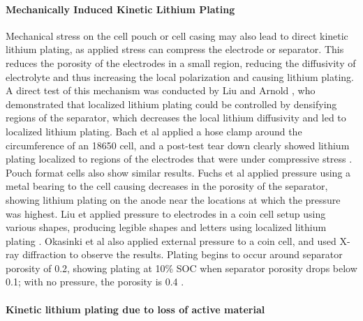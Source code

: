 \documentclass[journal=jpcl, manuscript=article, layout=onecolumn]{achemso}
\begin{document}
\paragraph{Mechanically Induced Kinetic Lithium Plating}
Mechanical stress on the cell pouch or cell casing may also lead to direct kinetic lithium plating, as applied stress can compress the electrode or separator. This reduces the porosity of the electrodes in a small region, reducing the diffusivity of electrolyte and thus increasing the local polarization and causing lithium plating. A direct test of this mechanism was conducted by Liu and Arnold \cite{liu_effects_2020}, who demonstrated that localized lithium plating could be controlled by densifying regions of the separator, which decreases the local lithium diffusivity and led to localized lithium plating. Bach et al applied a hose clamp around the circumference of an 18650 cell, and a post-test tear down clearly showed lithium plating localized to regions of the electrodes that were under compressive stress \cite{bach_nonlinear_2016}. Pouch format cells also show similar results. Fuchs et al applied pressure using a metal bearing to the cell causing decreases in the porosity of the separator, showing lithium plating on the anode near the locations at which the pressure was highest\cite{fuchs_post-mortem_2019}. Liu et applied pressure to electrodes in a coin cell setup using various shapes, producing legible shapes and letters using localized lithium plating \cite{liu_size_2018}. Okasinki et al also applied external pressure to a coin cell, and used X-ray diffraction to observe the results. Plating begins to occur around separator porosity of 0.2, showing plating at 10\% SOC when separator porosity drops below 0.1; with no pressure, the porosity is 0.4 \cite{okasinski_situ_2020}.

\paragraph{Kinetic lithium plating due to loss of active material}
\end{document}
